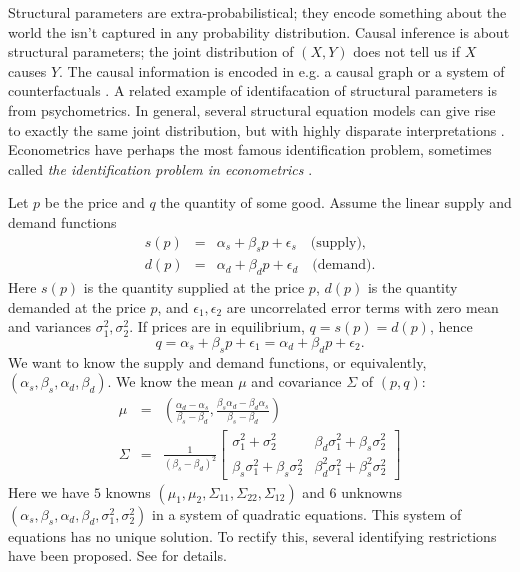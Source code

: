 Structural parameters are extra-probabilistical; they encode something
about the world the isn't captured in any probability distribution.
Causal inference is about structural parameters; the joint distribution
of $(X,Y)$ does not tell us if $X$ causes $Y$. The causal information
is encoded in e.g. a causal graph \parencite{Pearl2009-zf} or a system
of counterfactuals \parencite[Chapter 4]{Pearl2016-tc}. A related example
of identifacation of structural parameters is from psychometrics.
In general, several structural equation models can give rise to exactly
the same joint distribution, but with highly disparate interpretations
\parencite{Raykov2001-ap}. Econometrics have perhaps the most famous
identification problem, sometimes called \textit{the identification problem in econometrics} \parencite{Manski1999-ab}.
\begin{example}
 Let $p$ be the price and $q$ the quantity of some good. Assume
the linear supply and demand functions
\begin{eqnarray*}
s(p) & = & \alpha_{s}+\beta_{s}p+\epsilon_{s}\quad\textrm{(supply)},\\
d(p) & = & \alpha_{d}+\beta_{d}p+\epsilon_{d}\quad\textrm{(demand).}
\end{eqnarray*}
Here $s(p)$ is the quantity supplied at the price $p$, $d(p)$ is
the quantity demanded at the price $p$, and $\epsilon_{1},\epsilon_{2}$
are uncorrelated error terms with zero mean and variances $\sigma_{1}^{2},\sigma_{2}^{2}$.
If prices are in equilibrium, $q=s(p)=d(p)$, hence
\[
q=\alpha_{s}+\beta_{s}p+\epsilon_{1}=\alpha_{d}+\beta_{d}p+\epsilon_{2}.
\]
We want to know the supply and demand functions, or equivalently,
$(\alpha_{s},\beta_{s},\alpha_{d},\beta_{d})$. We know the mean $\mu$
and covariance $\Sigma$ of $(p,q)$:
\begin{eqnarray*}
\mu & = & \left(\frac{\alpha_{d}-\alpha_{s}}{\beta_{s}-\beta_{d}},\frac{\beta_{s}\alpha_{d}-\beta_{d}\alpha_{s}}{\beta_{s}-\beta_{d}}\right)\\
\Sigma & = & \frac{1}{(\beta_{s}-\beta_{d})^{2}}\left[\begin{array}{cc}
\sigma_{1}^{2}+\sigma_{2}^{2} & \beta_{d}\sigma_{1}^{2}+\beta_{s}\sigma_{2}^{2}\\
\beta_{s}\sigma_{1}^{2}+\beta_{s}\sigma_{2}^{2} & \beta_{d}^{2}\sigma_{1}^{2}+\beta_{s}^{2}\sigma_{2}^{2}
\end{array}\right]
\end{eqnarray*}
Here we have $5$ knowns $(\mu_{1},\mu_{2},\Sigma_{11},\Sigma_{22},\Sigma_{12})$
and $6$ unknowns $(\alpha_{s},\beta_{s},\alpha_{d},\beta_{d},\sigma_{1}^{2},\sigma_{2}^{2})$
in a system of quadratic equations. This system of equations has no
unique solution. To rectify this, several identifying restrictions have been proposed. See \textcite[Chapter 6]{Manski1999-ab} for details.
\end{example}